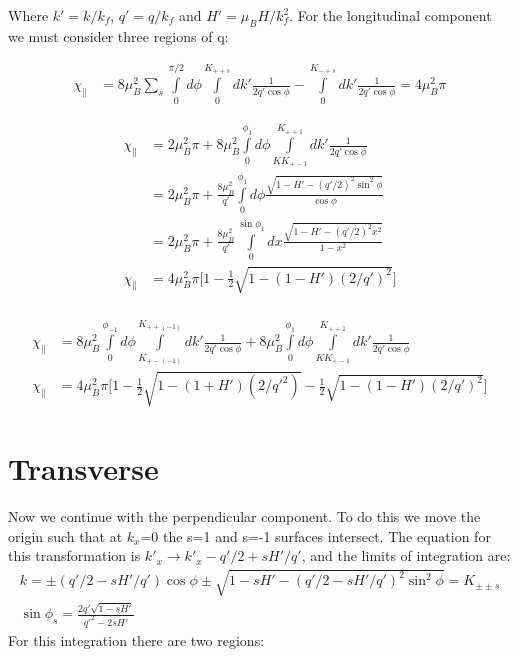 \documentclass[prb,showpacs,amssymb,amsmath,twocolumn]{revtex4-1}
\begin{document}
\begin{widetext}
 Where $k'=k/k_f$, $q'=q/k_f$ and $H'=\mu_B H/k_f^2$. For the longitudinal component we must consider three regions of q:%
 
 \begin{align*}
\chi_\parallel&=8\mu_B^2\sum\limits_s \int\limits_0^{\pi/2} d\phi \int\limits_0^{K_{++s}}dk'  \frac{ 1}{ 2q'\cos\phi}-\int\limits_0^{K_{-+s}} dk'  \frac{ 1}{ 2q'\cos\phi} =4\mu_B^2\pi
 \end{align*}
 
 \begin{align*}
\chi_\parallel&=2\mu_B^2\pi +8\mu_B^2\int\limits_0^{\phi_1} d\phi \int\limits_{KK_{+-1}}^{K_{++1}}dk'  \frac{ 1}{ 2q'\cos\phi} \\
&=2\mu_B^2\pi +\frac{8\mu_B^2}{q'}\int\limits_0^{\phi_1} d\phi  \frac{ \sqrt{1-H'-(q'/2)^2\sin^2\phi}}{ \cos\phi} \\
&=2\mu_B^2\pi +\frac{8\mu_B^2}{q'}\int\limits_0^{\sin\phi_1} dx  \frac{ \sqrt{1-H'-(q'/2)^2 x^2}}{ 1-x^2}  \\
\chi_\parallel&=4\mu_B^2\pi\bigg[1 - \frac{1}{2}\sqrt{1-(1-H')(2/q')^2}\bigg]  \\
 \end{align*}
 
 
   \begin{align*}
\chi_\parallel&=8\mu_B^2\int\limits_0^{\phi_{-1}} d\phi \int\limits_{K_{+-(-1)}}^{K_{++(-1)}}dk'  \frac{ 1}{ 2q'\cos\phi}  +8\mu_B^2\int\limits_0^{\phi_1} d\phi \int\limits_{KK_{+-1}}^{K_{++1}}dk'  \frac{ 1}{ 2q'\cos\phi} \\
\chi_\parallel&=4\mu_B^2\pi\bigg[1 - \frac{1}{2}\sqrt{1-(1+H')(2/q'^2)} -\frac{1}{2}\sqrt{1-(1-H')(2/q')^2}  \bigg]
 \end{align*}
  
  \section*{Transverse}
  Now we continue with the perpendicular component. To do this we move the origin such that at $k_x$=0 the s=1 and s=-1 surfaces intersect. The equation for this transformation is $k'_x \rightarrow k'_x-q'/2+sH'/q'$, and the limits of integration are:
 \begin{align*}
k=\pm(q'/2-sH'/q')\cos\phi\pm\sqrt{1-sH'-(q'/2-sH'/q')^2\sin^2\phi} = K_{\pm\pm s} \\ 
\sin{\phi_s}=\frac{2q'\sqrt{1-sH'} }{q'^2-2sH'}
 \end{align*}
 For this integration there are two regions:
 

\end{widetext}
\end{document}
